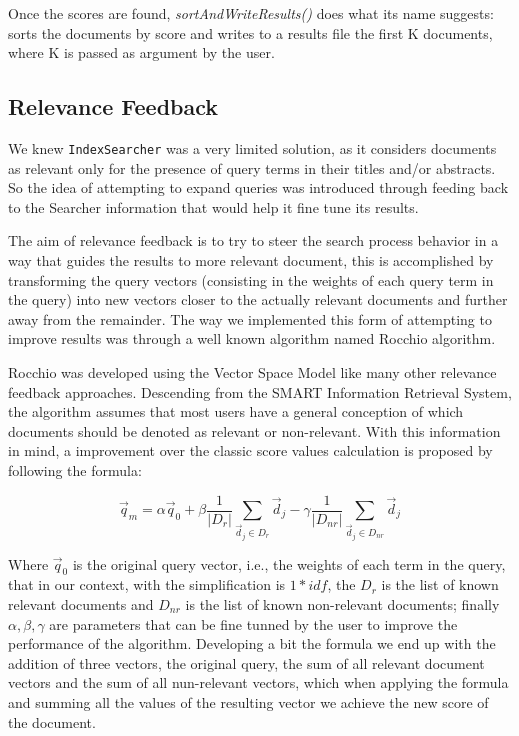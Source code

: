 \documentclass[12pt]{article}
\begin{document}
Once the scores are found, \textit{sortAndWriteResults()} does what its name 
suggests: sorts the documents by score and writes to a results file the first K
documents, where K is passed as argument by the user.

\subsection{Relevance Feedback}

We knew \texttt{IndexSearcher} was a very limited solution, as it considers 
documents as relevant only for the presence of query terms in their titles 
and/or abstracts.
So the idea of attempting to expand queries was introduced through feeding back
to the Searcher information that would help it fine tune its results.

The aim of relevance feedback is to try to steer the search process behavior in a way that guides the results to more relevant document, this is accomplished by transforming the query vectors (consisting in the
weights of each query term in the query) into new vectors closer to the actually
relevant documents and further away from the remainder.
The way we implemented this form of attempting to improve results was through 
a well known algorithm named Rocchio algorithm.

Rocchio was developed using the Vector Space Model like many other relevance feedback approaches. Descending from the SMART Information Retrieval System, the algorithm assumes that most users have a general conception of which documents should be denoted as relevant or non-relevant. With this information in mind, a improvement over the classic score values calculation is proposed by following the formula:

\begin{equation}
  \vec{q}_{m} = \alpha\vec{q}_{0} + \beta\frac{1}{|D_{r}|} \sum_{ \vec{d}_{j} \in D_{r}} \vec{d}_{j} - \gamma\frac{1}{|D_{nr}|} \sum_{ \vec{d}_{j} \in D_{nr}} \vec{d}_{j}
\end{equation}

Where $\vec{q}_{0}$ is the original query vector, i.e., the weights of each term in the query, that in our context, with the simplification is $1*idf$, the $D_{r}$ is the list of known relevant documents and $D_{nr}$ is the list of known non-relevant documents; finally $\alpha, \beta, \gamma$ are parameters that can be fine tunned by the user to improve the performance of the algorithm. Developing a bit the formula we end up with the addition of three vectors, the original query, the sum of all relevant document vectors and the sum of all nun-relevant vectors, which when applying the formula and summing all the values of the resulting vector we achieve the new score of the document.
\end{document}
